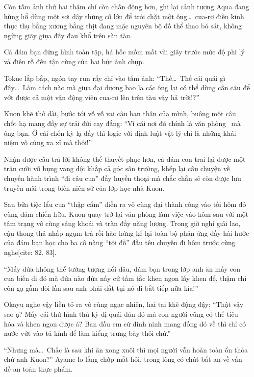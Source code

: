 \documentclass[../main.tex]{subfiles}
\begin{document}
Còn tấm ảnh thứ hai thậm chí còn chấn động hơn, ghi lại cảnh tượng Aqua đang hùng hổ dùng một sợi dây thừng cỡ lớn để trói chặt một ông\dots\ cua-rơ điền kinh thực thụ bằng xương bằng thịt đang mặc nguyên bộ đồ thể thao bó sát, không ngừng giãy giụa đầy đau khổ trên sàn tàu.

Cả đám bạn đứng hình toàn tập, há hốc mồm mất vài giây trước mức độ phi lý và điên rồ đến tận cùng của hai bức ảnh chụp.

Tokue lắp bắp, ngón tay run rẩy chỉ vào tấm ảnh: ``Thế\dots\ Thế cái quái gì đây\dots\ Làm cách nào mà giữa đại dương bao la các ông lại có thể dùng cần câu để vớt được cả một vận động viên cua-rơ lên trên tàu vậy hả trời!?''

Kuon khẽ thở dài, bước tới vỗ vỗ vai cậu bạn thân của mình, buông một câu chốt hạ mang đầy sự trải đời cay đắng: ``Vì cái nơi đó chính là văn phòng \hll\ mà ông bạn. Ở cái chốn kỳ lạ đấy thì logic với định luật vật lý chỉ là những khái niệm vô cùng xa xỉ mà thôi!''

Nhận được câu trả lời không thể thuyết phục hơn, cả đám con trai lại được một trận cười vỡ bụng vang dội khắp cả góc sân trường, khép lại câu chuyện về chuyến hành trình ``đi câu cua'' đầy huyền thoại mà chắc chắn sẽ còn được lưu truyền mãi trong biên niên sử của lớp học nhà Kuon.
\ct

Sau bữa tiệc lẩu cua ``thập cẩm'' diễn ra vô cùng đại thành công vào tối hôm đó cùng đám chiến hữu, Kuon quay trở lại văn phòng làm việc vào hôm sau với một tâm trạng vô cùng sảng khoái và tràn đầy năng lượng. Trong giờ nghỉ giải lao, cậu thong thả nhấp ngụm trà rồi hào hứng kể lại toàn bộ phản ứng đầy hài hước của đám bạn học cho ba cô nàng ``tội đồ'' đầu têu chuyến đi hôm trước cùng nghe[cite: 82, 83].

``Mấy đứa không thể tưởng tượng nổi đâu, đám bạn trong lớp anh ăn mấy con cua biến dị đó mà đứa nào đứa nấy cứ tấm tắc khen ngon lấy khen để, thậm chí còn gạ gẫm đòi lần sau anh phải dắt tụi nó đi bắt tiếp nữa kìa!''

Okayu nghe vậy liền tỏ ra vô cùng ngạc nhiên, hai tai khẽ động đậy: ``Thật vậy sao ạ?  Mấy cái thứ hình thù kỳ dị quái đản đó mà con người cũng có thể tiêu hóa và khen ngon được á? Ban đầu em cứ đinh ninh mang đống đó về thì chỉ có nước vứt vào tủ kính để làm kiểng trưng bày thôi chứ.''

``Nhưng mà\dots\ Chắc là sau khi ăn xong xuôi thì mọi người vẫn hoàn toàn ổn thỏa chứ anh Kuon?'' Ayame lo lắng chớp mắt hỏi, trong lòng có chút bất an về vấn đề an toàn thực phẩm.
\end{document}
